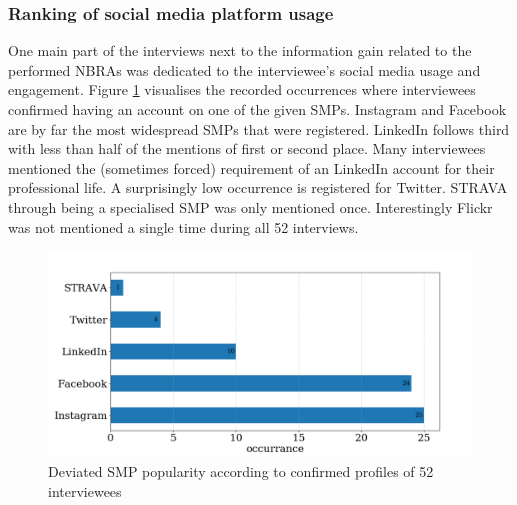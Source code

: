 \subsubsection{Ranking of social media platform usage}
One main part of the interviews next to the information gain related to the performed NBRAs was dedicated to the interviewee's social media usage and engagement. Figure \ref{fig:interview_SMP} visualises the recorded occurrences where interviewees confirmed having an account on one of the given SMPs. Instagram and Facebook are by far the most widespread SMPs that were registered. LinkedIn follows third with less than half of the mentions of first or second place. Many interviewees mentioned the (sometimes forced) requirement of an LinkedIn account for their professional life.
A surprisingly low occurrence is registered for Twitter. STRAVA through being a specialised SMP was only mentioned once. Interestingly Flickr was not mentioned a single time during all 52 interviews.
\begin{figure}[h!]
   \centering
   \includegraphics[width=\textwidth]{img/interview_socialmedia_bigger_font.pdf}
   \caption{Deviated SMP popularity according to confirmed profiles of 52 interviewees}
   \label{fig:interview_SMP}
\end{figure}

